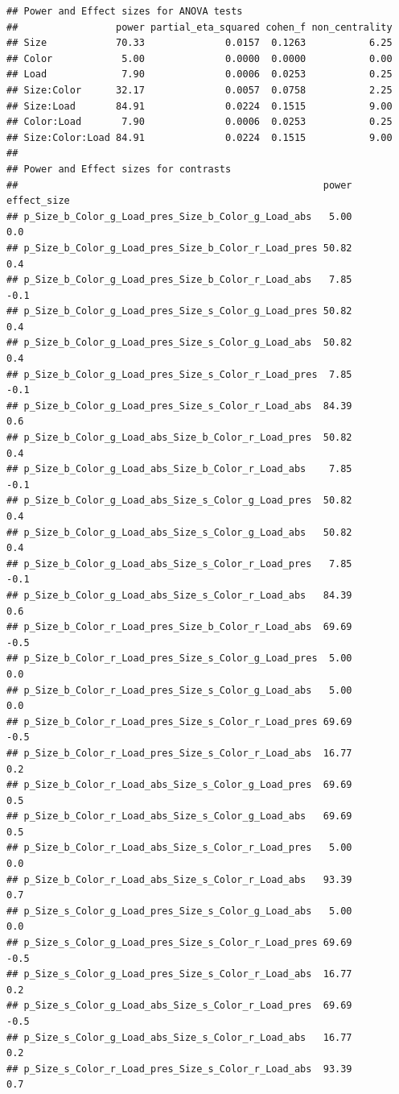 \documentclass[]{book}
\begin{document}
\begin{verbatim}
## Power and Effect sizes for ANOVA tests
##                 power partial_eta_squared cohen_f non_centrality
## Size            70.33              0.0157  0.1263           6.25
## Color            5.00              0.0000  0.0000           0.00
## Load             7.90              0.0006  0.0253           0.25
## Size:Color      32.17              0.0057  0.0758           2.25
## Size:Load       84.91              0.0224  0.1515           9.00
## Color:Load       7.90              0.0006  0.0253           0.25
## Size:Color:Load 84.91              0.0224  0.1515           9.00
## 
## Power and Effect sizes for contrasts
##                                                     power effect_size
## p_Size_b_Color_g_Load_pres_Size_b_Color_g_Load_abs   5.00         0.0
## p_Size_b_Color_g_Load_pres_Size_b_Color_r_Load_pres 50.82         0.4
## p_Size_b_Color_g_Load_pres_Size_b_Color_r_Load_abs   7.85        -0.1
## p_Size_b_Color_g_Load_pres_Size_s_Color_g_Load_pres 50.82         0.4
## p_Size_b_Color_g_Load_pres_Size_s_Color_g_Load_abs  50.82         0.4
## p_Size_b_Color_g_Load_pres_Size_s_Color_r_Load_pres  7.85        -0.1
## p_Size_b_Color_g_Load_pres_Size_s_Color_r_Load_abs  84.39         0.6
## p_Size_b_Color_g_Load_abs_Size_b_Color_r_Load_pres  50.82         0.4
## p_Size_b_Color_g_Load_abs_Size_b_Color_r_Load_abs    7.85        -0.1
## p_Size_b_Color_g_Load_abs_Size_s_Color_g_Load_pres  50.82         0.4
## p_Size_b_Color_g_Load_abs_Size_s_Color_g_Load_abs   50.82         0.4
## p_Size_b_Color_g_Load_abs_Size_s_Color_r_Load_pres   7.85        -0.1
## p_Size_b_Color_g_Load_abs_Size_s_Color_r_Load_abs   84.39         0.6
## p_Size_b_Color_r_Load_pres_Size_b_Color_r_Load_abs  69.69        -0.5
## p_Size_b_Color_r_Load_pres_Size_s_Color_g_Load_pres  5.00         0.0
## p_Size_b_Color_r_Load_pres_Size_s_Color_g_Load_abs   5.00         0.0
## p_Size_b_Color_r_Load_pres_Size_s_Color_r_Load_pres 69.69        -0.5
## p_Size_b_Color_r_Load_pres_Size_s_Color_r_Load_abs  16.77         0.2
## p_Size_b_Color_r_Load_abs_Size_s_Color_g_Load_pres  69.69         0.5
## p_Size_b_Color_r_Load_abs_Size_s_Color_g_Load_abs   69.69         0.5
## p_Size_b_Color_r_Load_abs_Size_s_Color_r_Load_pres   5.00         0.0
## p_Size_b_Color_r_Load_abs_Size_s_Color_r_Load_abs   93.39         0.7
## p_Size_s_Color_g_Load_pres_Size_s_Color_g_Load_abs   5.00         0.0
## p_Size_s_Color_g_Load_pres_Size_s_Color_r_Load_pres 69.69        -0.5
## p_Size_s_Color_g_Load_pres_Size_s_Color_r_Load_abs  16.77         0.2
## p_Size_s_Color_g_Load_abs_Size_s_Color_r_Load_pres  69.69        -0.5
## p_Size_s_Color_g_Load_abs_Size_s_Color_r_Load_abs   16.77         0.2
## p_Size_s_Color_r_Load_pres_Size_s_Color_r_Load_abs  93.39         0.7
\end{verbatim}
\end{document}
